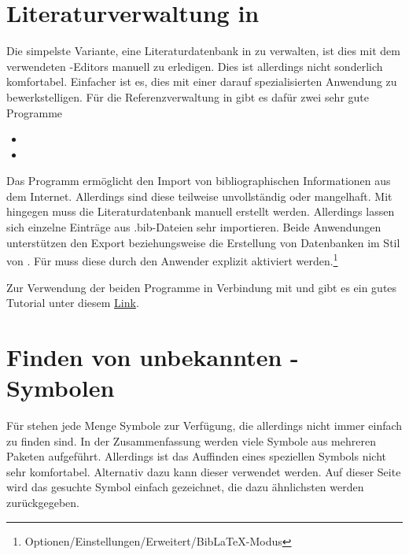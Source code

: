 \section{Literaturverwaltung in }
%
Die simpelste Variante, eine Literaturdatenbank in  zu verwalten, 
ist dies mit dem verwendeten -Editors manuell zu erledigen. Dies 
ist allerdings nicht sonderlich komfortabel. Einfacher ist es, dies mit einer 
darauf spezialisierten Anwendung zu bewerkstelligen. Für die Referenzverwaltung 
in  gibt es dafür zwei sehr gute Programme
%
\begin{itemize}
\item {}
\item {}
\end{itemize}
%
Das Programm  ermöglicht den Import von bibliographischen 
Informationen aus dem Internet. Allerdings sind diese teilweise unvollständig 
oder mangelhaft. Mit  hingegen muss die Literaturdatenbank 
manuell erstellt werden. Allerdings lassen sich einzelne Einträge aus 
.bib-Dateien sehr importieren. Beide Anwendungen unterstützen den Export 
beziehungsweise die Erstellung von Datenbanken im Stil von . 
Für  muss diese durch den Anwender explizit aktiviert 
werden.\footnote{Optionen/Einstellungen/Erweitert/BibLaTeX-Modus}

Zur Verwendung der beiden Programme in Verbindung mit  und 
 gibt es ein gutes Tutorial unter diesem
\href{http://www.suedraum.de/latex/stammtisch/degenkolb_latex_biblatex_folien-final.pdf}{Link}.



\section{Finden von unbekannten -Symbolen}
Für  stehen jede Menge Symbole zur Verfügung, die allerdings 
nicht immer einfach zu finden sind. In der Zusammenfassung
werden viele Symbole aus mehreren Paketen aufgeführt. Allerdings ist das 
Auffinden eines speziellen Symbols nicht sehr komfortabel. Alternativ dazu kann 
dieser  verwendet 
werden. Auf dieser Seite wird das gesuchte Symbol einfach gezeichnet, die dazu 
ähnlichsten werden zurückgegeben.



